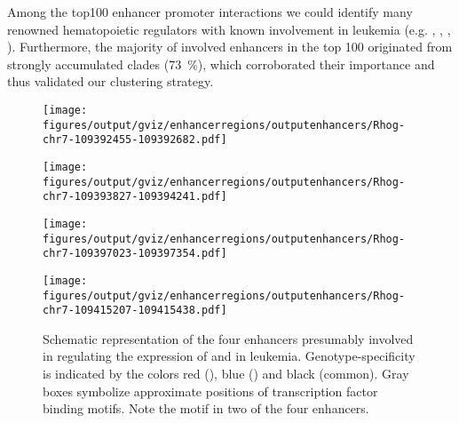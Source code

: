 Among the top\num{100} enhancer promoter interactions we could identify many renowned hematopoietic regulators with known involvement in leukemia (e.g. , , , ). Furthermore, the majority of involved enhancers in the top 100 originated from strongly accumulated clades (\SI{73}{\percent}), which corroborated their importance and thus validated our clustering strategy.

\begin{figure}[!bth]
	\vspace{4em}
	\begin{minipage}{0.5\textwidth}
		\texttt{[image: figures/output/gviz/enhancerregions/outputenhancers/Rhog-chr7-109392455-109392682.pdf]} 
	\end{minipage}
	\begin{minipage}{0.5\textwidth}
		\texttt{[image: figures/output/gviz/enhancerregions/outputenhancers/Rhog-chr7-109393827-109394241.pdf]} 
	\end{minipage}
	\begin{minipage}{0.5\textwidth}
		\texttt{[image: figures/output/gviz/enhancerregions/outputenhancers/Rhog-chr7-109397023-109397354.pdf]} 
	\end{minipage}
	\begin{minipage}{0.5\textwidth}
		\texttt{[image: figures/output/gviz/enhancerregions/outputenhancers/Rhog-chr7-109415207-109415438.pdf]} 
	\end{minipage}
	\caption{Schematic representation of the four enhancers presumably involved in regulating the expression of  and   in \mllafnine leukemia. Genotype-specificity is indicated by the colors red (\dnmtchipregular), blue (\dnmtwtregular) and black (common). Gray boxes symbolize approximate positions of transcription factor binding motifs. Note the \motifmlltwo motif in two of the four enhancers.}
	\label{fig:enhancers:rhognup98:enh}
\end{figure}

